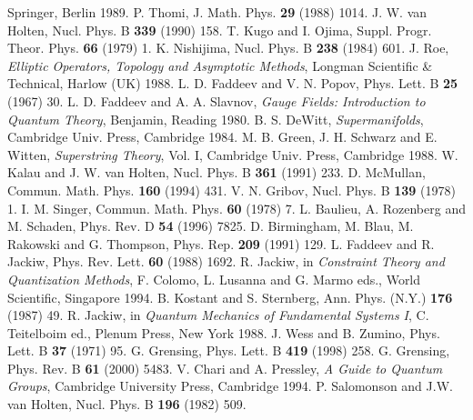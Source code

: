 \documentclass[a4paper,10pt]{article}
\begin{document}
\begin{thebibliography}{99}
Springer, Berlin 1989.
P. Thomi, J. Math. Phys. \textbf{29} (1988) 1014.
J. W. van Holten, Nucl. Phys. B \textbf{339} (1990) 158.
T. Kugo and I. Ojima, Suppl. Progr. Theor. Phys. \textbf{66} (1979) 1.
K. Nishijima, Nucl. Phys. B \textbf{238} (1984) 601.
J. Roe, \textit{Elliptic Operators, Topology and Asymptotic Methods}, 
Longman Scientific \& Technical, Harlow (UK) 1988.
L. D. Faddeev and V. N. Popov, Phys. Lett. B \textbf{25} (1967) 30.
L. D. Faddeev and  A. A. Slavnov, \textit{Gauge Fields: Introduction to Quantum Theory}, 
Benjamin, Reading 1980.
B. S. DeWitt, \textit{Supermanifolds}, Cambridge Univ. Press, Cambridge 1984.
M. B. Green, J. H. Schwarz and E. Witten, \textit{Superstring Theory}, Vol. I, Cambridge 
Univ. Press, Cambridge 1988. 
W. Kalau and J. W. van Holten, Nucl. Phys. B \textbf{361} (1991) 233.
D. McMullan, Commun. Math. Phys. \textbf{160} (1994) 431.
V. N. Gribov, Nucl. Phys. B \textbf{139} (1978) 1.
I. M. Singer, Commun. Math. Phys. \textbf{60} (1978) 7.
L. Baulieu, A. Rozenberg and M. Schaden, Phys. Rev. D \textbf{54} (1996) 7825.
D. Birmingham, M. Blau, M. Rakowski and G. Thompson, Phys. Rep. \textbf{209} (1991) 129.
L. Faddeev and R. Jackiw, Phys. Rev. Lett. \textbf{60} (1988) 1692.
R. Jackiw, in \textit{Constraint Theory and Quantization Methods}, F. Colomo, L. Lusanna 
and G. Marmo eds., World Scientific, Singapore 1994.
B. Kostant and S. Sternberg, Ann. Phys. (N.Y.) \textbf{176} (1987) 49.
R. Jackiw, in \textit{Quantum Mechanics of Fundamental Systems I}, C. Teitelboim ed., 
Plenum Press, New York 1988. 
J. Wess and B. Zumino, Phys. Lett. B \textbf{37} (1971) 95.
G. Grensing, Phys. Lett. B \textbf{419} (1998) 258.
G. Grensing, Phys. Rev. B \textbf{61} (2000) 5483.
V. Chari and A. Pressley, \textit{A Guide to Quantum Groups}, Cambridge University 
Press, Cambridge 1994.
P. Salomonson and J.W. van Holten, Nucl. Phys. B \textbf{196} (1982) 509.
\end{thebibliography}
\end{document}
